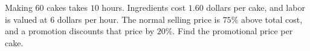 Making $60$ cakes takes $10$ hours. Ingredients cost $1.60$ dollars per cake, and labor is valued at $6$ dollars per hour. The normal selling price is $75\%$ above total cost, and a promotion discounts that price by $20\%$. Find the promotional price per cake.
